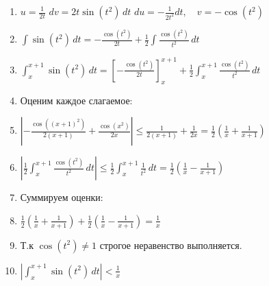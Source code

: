\documentclass[a4paper,12pt]{article}
\begin{document}
\begin{enumerate}
    \item $ u = \frac{1}{2t}$ $dv = 2t \sin(t^2) \, dt$ $   du = -\frac{1}{2t^2} dt, \quad v = -\cos(t^2)$
    \item $\int \sin(t^2) \, dt = -\frac{\cos(t^2)}{2t} + \frac{1}{2} \int \frac{\cos(t^2)}{t^2} \, dt$
    \item $\int_{x}^{x+1} \sin(t^2) \, dt = \left[ -\frac{\cos(t^2)}{2t} \right]_{x}^{x+1} + \frac{1}{2} \int_{x}^{x+1} \frac{\cos(t^2)}{t^2} \, dt$
    \item Оценим каждое слагаемое:
    \item $\left| -\frac{\cos((x+1)^2)}{2(x+1)} + \frac{\cos(x^2)}{2x} \right| \leq \frac{1}{2(x+1)} + \frac{1}{2x} = \frac{1}{2}\left( \frac{1}{x} + \frac{1}{x+1} \right)$
    \item $\left| \frac{1}{2} \int_{x}^{x+1} \frac{\cos(t^2)}{t^2} \, dt \right| \leq \frac{1}{2} \int_{x}^{x+1} \frac{1}{t^2} \, dt = \frac{1}{2} \left( \frac{1}{x} - \frac{1}{x+1} \right)$
    \item Суммируем оценки:
    \item $\frac{1}{2}\left( \frac{1}{x} + \frac{1}{x+1} \right) + \frac{1}{2}\left( \frac{1}{x} - \frac{1}{x+1} \right) = \frac{1}{x}$
    \item Т.к $\cos(t^2) \ne 1$ строгое неравенство выполняется.
    \item $\left| \int_{x}^{x+1} \sin(t^2) \, dt \right| < \frac{1}{x}$
\end{enumerate}
\end{document}
